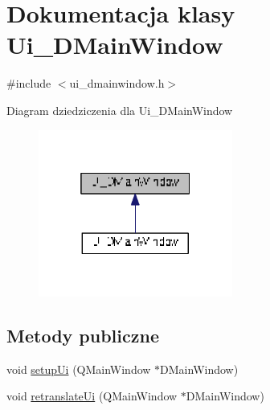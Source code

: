 \hypertarget{class_ui___d_main_window}{}\section{Dokumentacja klasy Ui\+\_\+\+D\+Main\+Window}
\label{class_ui___d_main_window}


{\ttfamily \#include $<$ui\+\_\+dmainwindow.\+h$>$}



Diagram dziedziczenia dla Ui\+\_\+\+D\+Main\+Window\nopagebreak
\begin{figure}[H]
\begin{center}
\leavevmode
\includegraphics[width=181pt]{class_ui___d_main_window__inherit__graph}
\end{center}
\end{figure}
\subsection*{Metody publiczne}
\begin{DoxyCompactItemize}
\item 
void \hyperlink{class_ui___d_main_window_aa53f3a89bf520704a3e79037df2fd451}{setup\+Ui} (Q\+Main\+Window $\ast$D\+Main\+Window)
\item 
void \hyperlink{class_ui___d_main_window_a406169c751ddfd205b89375c7542827c}{retranslate\+Ui} (Q\+Main\+Window $\ast$D\+Main\+Window)
\end{DoxyCompactItemize}
